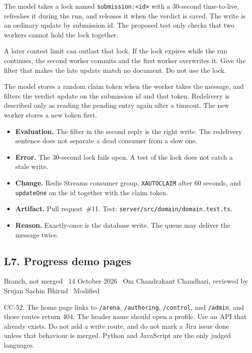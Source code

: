 \documentclass[11pt,a4paper]{article}
\newcommand{\meta}[1]{{\footnotesize\color{quiet}#1}\par\vspace{0.2em}}
\newcommand{\step}[1]{\par\vspace{0.45em}{\bfseries #1}\par\vspace{0.05em}}
\begin{document}
\step{2. Reply (summarised)}
The model takes a lock named \texttt{submission:<id>} with a 30-second time-to-live, refreshes it during the run, and releases it when the verdict is saved. The write is an ordinary update by submission id. The proposed test only checks that two workers cannot hold the lock together.

\step{3. Follow-up}
A later contest limit can outlast that lock. If the lock expires while the run continues, the second worker commits and the first worker overwrites it. Give the filter that makes the late update match no document. Do not use the lock.

\step{4. Follow-up reply (summarised)}
The model stores a random claim token when the worker takes the message, and filters the verdict update on the submission id and that token. Redelivery is described only as reading the pending entry again after a timeout. The new worker stores a new token first.

\step{5. Decision}
\begin{itemize}
\item \textbf{Evaluation.} The filter in the second reply is the right write. The redelivery sentence does not separate a dead consumer from a slow one.
\item \textbf{Error.} The 30-second lock fails open. A test of the lock does not catch a stale write.
\item \textbf{Change.} Redis Streams consumer group, \texttt{XAUTOCLAIM} after 60 seconds, and \texttt{updateOne} on the id together with the claim token.
\item \textbf{Artifact.} Pull request~\#11. Test: \texttt{server/src/domain/domain.test.ts}.
\item \textbf{Reason.} Exactly-once is the database write. The queue may deliver the message twice.
\end{itemize}

\subsection{L7. Progress demo pages}
\meta{Branch, not merged \textperiodcentered\ 14 October 2026 \textperiodcentered\ Om Chandrakant Chaudhari, reviewed by Srujan Sachin Bhirud \textperiodcentered\ Modified}

\step{1. Prompt}
CC-52. The home page links to \texttt{/arena}, \texttt{/authoring}, \texttt{/control}, and \texttt{/admin}, and those routes return 404. The header name should open a profile. Use an API that already exists. Do not add a write route, and do not mark a Jira issue done unless that behaviour is merged. Python and JavaScript are the only judged languages.
\end{document}
